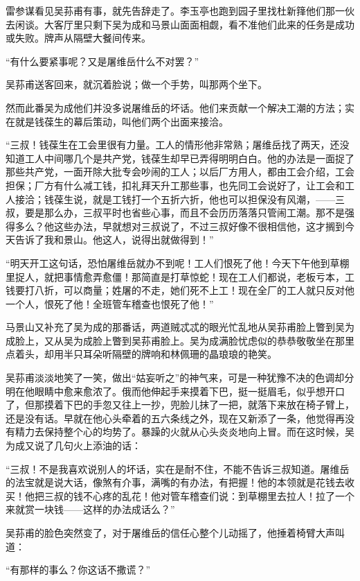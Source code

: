 \par 雷参谋看见吴荪甫有事，就先告辞走了。李玉亭也跑到园子里找杜新箨他们那一伙去闲谈。大客厅里只剩下吴为成和马景山面面相觑，看不准他们此来的任务是成功或失败。牌声从隔壁大餐间传来。
\par “有什么要紧事呢？又是屠维岳什么不对罢？”
\par 吴荪甫送客回来，就沉着脸说；做一个手势，叫那两个坐下。
\par 然而此番吴为成他们并没多说屠维岳的坏话。他们来贡献一个解决工潮的方法；实在就是钱葆生的幕后策动，叫他们两个出面来接洽。
\par “三叔！钱葆生在工会里很有力量。工人的情形他非常熟；屠维岳找了两天，还没知道工人中间哪几个是共产党，钱葆生却早已弄得明明白白。他的办法是一面捉了那些共产党，一面开除大批专会吵闹的工人；以后厂方用人，都由工会介绍，工会担保；厂方有什么减工钱，扣礼拜天升工那些事，也先同工会说好了，让工会和工人接洽；钱葆生说，就是工钱打一个五折六折，他也可以担保没有风潮，——三叔，要是那么办，三叔平时也省些心事，而且不会历历落落只管闹工潮。那不是强得多么？他这些办法，早就想对三叔说了，不过三叔好像不很相信他，这才搁到今天告诉了我和景山。他这人，说得出就做得到！”
\par “明天开工这句话，恐怕屠维岳就办不到呢！工人们恨死了他！今天下午他到草棚里捉人，就把事情愈弄愈僵！那简直是打草惊蛇！现在工人们都说，老板亏本，工钱要打八折，可以商量；姓屠的不走，她们死不上工！现在全厂的工人就只反对他一个人，恨死了他！全班管车稽查也恨死了他！”
\par 马景山又补充了吴为成的那番话，两道贼忒忒的眼光忙乱地从吴荪甫脸上瞥到吴为成脸上，又从吴为成脸上瞥到吴荪甫脸上。吴为成满脸忧虑似的恭恭敬敬坐在那里点着头，却用半只耳朵听隔壁的牌响和林佩珊的晶琅琅的艳笑。
\par 吴荪甫淡淡地笑了一笑，做出“姑妄听之”的神气来，可是一种犹豫不决的色调却分明在他眼睛中愈来愈浓了。俄而他伸起手来摸着下巴，挺一挺眉毛，似乎想开口了，但那摸着下巴的手忽又往上一抄，兜脸儿抹了一把，就落下来放在椅子臂上，还是没有话。早就在他心头牵着的五六条线之外，现在又新添了一条，他觉得再没有精力去保持整个心的均势了。暴躁的火就从心头炎炎地向上冒。而在这时候，吴为成又说了几句火上添油的话：
\par “三叔！不是我喜欢说别人的坏话，实在是耐不住，不能不告诉三叔知道。屠维岳的法宝就是说大话，像煞有介事，满嘴的有办法，有把握！他的本领就是花钱去收买！他把三叔的钱不心疼的乱花！他对管车稽查们说：到草棚里去拉人！拉了一个来就赏一块钱——这样的办法成话么？”
\par 吴荪甫的脸色突然变了，对于屠维岳的信任心整个儿动摇了，他捶着椅臂大声叫道：
\par “有那样的事么？你这话不撒谎？”
